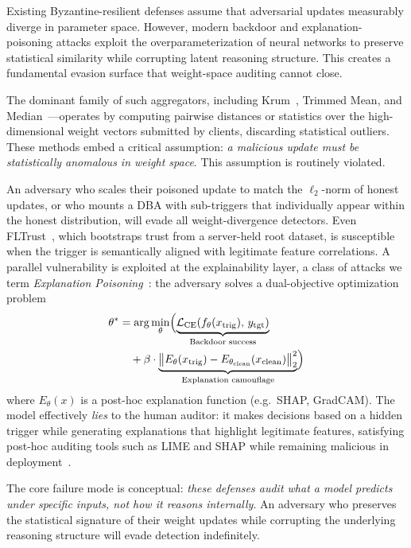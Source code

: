 \documentclass[journal]{IEEEtran}
\begin{document}
Existing Byzantine-resilient defenses assume that adversarial updates
measurably diverge in parameter space. However, modern backdoor and
explanation-poisoning attacks exploit the overparameterization of neural
networks to preserve statistical similarity while corrupting latent
reasoning structure. This creates a fundamental evasion surface that
weight-space auditing cannot close.

The dominant family of such aggregators, including
Krum~\cite{blanchard2017krum}, Trimmed Mean, and
Median~\cite{yin2018byzantinerobust}---operates by computing pairwise
distances or statistics over the high-dimensional weight vectors submitted
by clients, discarding statistical outliers. These methods embed a critical
assumption: \textit{a malicious update must be statistically anomalous in
weight space}. This assumption is routinely violated.

An adversary who scales their poisoned update to match the $\ell_2$-norm of
honest updates, or who mounts a DBA with sub-triggers that individually
appear within the honest distribution, will evade all weight-divergence
detectors. Even FLTrust~\cite{cao2021fltrust}, which bootstraps trust from
a server-held root dataset, is susceptible when the trigger is semantically
aligned with legitimate feature correlations. A parallel vulnerability is
exploited at the explainability layer, a class of attacks we term
\textit{Explanation Poisoning}~\cite{liyanage2024scaffolding,slack2020fooling}:
the adversary solves a dual-objective optimization problem
\begin{equation}
\begin{split}
  \theta^* &= \arg\min_{\theta}\Bigl(
    \underbrace{\mathcal{L}_{\text{CE}}(f_{\theta}(x_{\text{trig}}),\,
      y_{\text{tgt}})}_{\text{Backdoor success}} \\
    &\quad + \beta\cdot
    \underbrace{\bigl\|E_{\theta}(x_{\text{trig}})
      - E_{\theta_{\text{clean}}}(x_{\text{clean}})\bigr\|_2^2}_{\text{Explanation camouflage}}
  \Bigr)
\end{split}
  \label{eq:exppoison}
\end{equation}
where $E_{\theta}(x)$ is a post-hoc explanation function (e.g.\ SHAP,
GradCAM). The model effectively \textit{lies} to the human auditor:
it makes decisions based on a hidden trigger while generating explanations
that highlight legitimate features, satisfying post-hoc auditing tools such
as LIME and SHAP while remaining malicious in deployment~\cite{heo2019fooling}.

The core failure mode is conceptual: \textit{these defenses audit what a
model predicts under specific inputs, not how it reasons internally}.
An adversary who preserves the statistical signature of their weight updates
while corrupting the underlying reasoning structure will evade detection
indefinitely.
\end{document}
